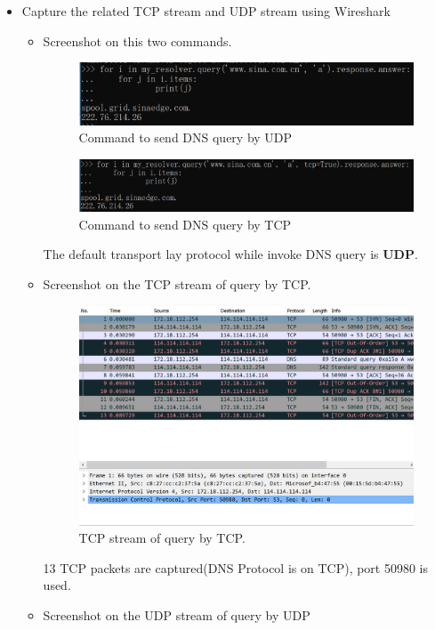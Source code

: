 \documentclass[12pt,letterpaper]{ctexart}
\begin{document}
\begin{itemize}
  \item Capture the related TCP stream and UDP stream using Wireshark
  \begin{itemize}
    \item Screenshot on this two commands.
    \begin{figure}[H]
      \centering
      \includegraphics[width=0.8\linewidth]{assets/cmd_udp.png}
      \caption{Command to send DNS query by UDP}
      \label{fig:cmd_udp}
    \end{figure}
    \begin{figure}[H]
      \centering
      \includegraphics[width=0.8\linewidth]{assets/cmd_tcp.png}
      \caption{Command to send DNS query by TCP}
      \label{fig:cmd_tcp}
    \end{figure}

    The default transport lay protocol while invoke DNS query is {\bf UDP}.
    \item Screenshot on the TCP stream of query by TCP.

    \begin{figure}[H]
      \centering
      \includegraphics[width=0.8\linewidth]{assets/pic_tcp.png}
      \caption{TCP stream of query by TCP.}
      \label{fig:pic_tcp}
    \end{figure}
    13 TCP packets are captured(DNS Protocol is on TCP), port 50980 is used.
    \item Screenshot on the UDP stream of query by UDP


\end{itemize}
\end{itemize}
\end{document}
